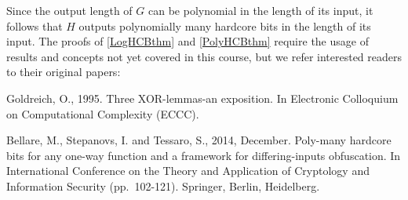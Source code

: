 \hypertarget{PolyHCBthm}{}

Since the output length of \(G\) can be polynomial in the length of its
input, it follows that \(H\) outputs polynomially many hardcore bits in
the length of its input. The proofs of \cref{LogHCBthm} and
\cref{PolyHCBthm} require the usage of results and concepts not yet
covered in this course, but we refer interested readers to their
original papers:

Goldreich, O., 1995. Three XOR-lemmas-an exposition. In Electronic
Colloquium on Computational Complexity (ECCC).

Bellare, M., Stepanovs, I. and Tessaro, S., 2014, December. Poly-many
hardcore bits for any one-way function and a framework for
differing-inputs obfuscation. In International Conference on the Theory
and Application of Cryptology and Information Security (pp.~102-121).
Springer, Berlin, Heidelberg.
